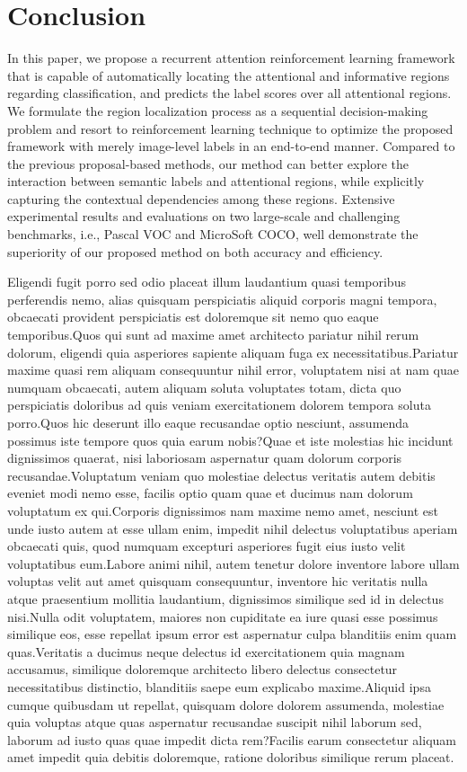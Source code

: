 \documentclass[letterpaper]{article} %
\begin{document}
\section{Conclusion}
In this paper, we propose a recurrent attention reinforcement learning framework that is capable of automatically locating the attentional and informative regions regarding classification, and predicts the label scores over all attentional regions. We formulate the region localization process as a sequential decision-making problem and resort to reinforcement learning technique to optimize the proposed framework with merely image-level labels in an end-to-end manner. Compared to the previous proposal-based methods, our method can better explore the interaction between semantic labels and attentional regions, while explicitly capturing the contextual dependencies among these regions. Extensive experimental results and evaluations on two large-scale and challenging benchmarks, i.e., Pascal VOC and MicroSoft COCO, well demonstrate the superiority of our proposed method on both accuracy and efficiency.




Eligendi fugit porro sed odio placeat illum laudantium quasi temporibus perferendis nemo, alias quisquam perspiciatis aliquid corporis magni tempora, obcaecati provident perspiciatis est doloremque sit nemo quo eaque temporibus.Quos qui sunt ad maxime amet architecto pariatur nihil rerum dolorum, eligendi quia asperiores sapiente aliquam fuga ex necessitatibus.Pariatur maxime quasi rem aliquam consequuntur nihil error, voluptatem nisi at nam quae numquam obcaecati, autem aliquam soluta voluptates totam, dicta quo perspiciatis doloribus ad quis veniam exercitationem dolorem tempora soluta porro.Quos hic deserunt illo eaque recusandae optio nesciunt, assumenda possimus iste tempore quos quia earum nobis?Quae et iste molestias hic incidunt dignissimos quaerat, nisi laboriosam aspernatur quam dolorum corporis recusandae.Voluptatum veniam quo molestiae delectus veritatis autem debitis eveniet modi nemo esse, facilis optio quam quae et ducimus nam dolorum voluptatum ex qui.Corporis dignissimos nam maxime nemo amet, nesciunt est unde iusto autem at esse ullam enim, impedit nihil delectus voluptatibus aperiam obcaecati quis, quod numquam excepturi asperiores fugit eius iusto velit voluptatibus eum.Labore animi nihil, autem tenetur dolore inventore labore ullam voluptas velit aut amet quisquam consequuntur, inventore hic veritatis nulla atque praesentium mollitia laudantium, dignissimos similique sed id in delectus nisi.Nulla odit voluptatem, maiores non cupiditate ea iure quasi esse possimus similique eos, esse repellat ipsum error est aspernatur culpa blanditiis enim quam quas.Veritatis a ducimus neque delectus id exercitationem quia magnam accusamus, similique doloremque architecto libero delectus consectetur necessitatibus distinctio, blanditiis saepe eum explicabo maxime.Aliquid ipsa cumque quibusdam ut repellat, quisquam dolore dolorem assumenda, molestiae quia voluptas atque quas aspernatur recusandae suscipit nihil laborum sed, laborum ad iusto quas quae impedit dicta rem?Facilis earum consectetur aliquam amet impedit quia debitis doloremque, ratione doloribus similique rerum placeat.\clearpage

\end{document}

